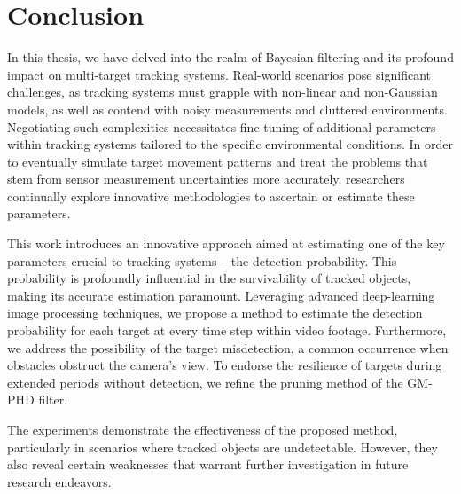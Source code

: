 \chapter{Conclusion}
%
%

In this thesis, we have delved into the realm of Bayesian filtering and its profound impact on multi-target tracking
systems. Real-world scenarios pose significant challenges, as tracking systems must grapple with non-linear and non-Gaussian models, as well as contend with noisy measurements and cluttered environments. Negotiating such complexities necessitates fine-tuning of additional parameters within tracking systems tailored to the specific environmental conditions. In order to eventually simulate target movement patterns and treat the problems that stem from sensor measurement uncertainties more accurately, researchers continually explore innovative methodologies to ascertain or estimate these parameters.

This work introduces an innovative approach aimed at estimating one of the key parameters crucial to tracking systems --
the detection probability. This probability is profoundly influential in the survivability of tracked objects, making
its
accurate
estimation paramount. Leveraging advanced deep-learning image processing techniques, we propose a method to estimate
the detection probability for each target at every time step within video footage. Furthermore, we address the
possibility of the target misdetection, a common occurrence when obstacles obstruct the camera's view. To endorse the
resilience of targets during extended periods without detection, we refine the pruning method of the GM-PHD filter.

The experiments demonstrate the effectiveness of the proposed method, particularly in scenarios where tracked objects are undetectable. However, they also reveal certain weaknesses that warrant further investigation in future research endeavors.




